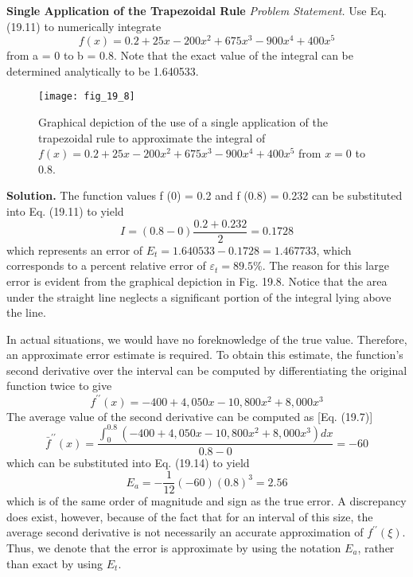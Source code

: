 \documentclass[../main.tex]{subfiles}
\begin{document}
\begin{exmp} \textbf{Single Application of the Trapezoidal Rule}
    \noindent\textit{Problem Statement.} Use Eq. (19.11) to numerically integrate
    \begin{equation}
		f(x)=0.2+25 x-200 x^{2}+675 x^{3}-900 x^{4}+400 x^{5}\nonumber
		\end{equation}
		from a = 0 to b = 0.8. Note that the exact value of the integral can be determined analytically to be 1.640533.

		\begin{figure}[H]
			\centering
			\texttt{[image: fig\_19\_8]}
		   \caption{\textsf{Graphical depiction of the use of a single application of the trapezoidal rule to approximate the integral of $f(x)=0.2+25 x-200 x^{2}+675 x^{3}-900 x^{4}+400 x^{5}$ from $x=0$ to $0.8$.}}\label{fig:fig_19_8}
		\end{figure}

	\noindent \textbf{Solution.} The function values f (0) = 0.2 and f (0.8) = 0.232 can be substituted into
	Eq. (19.11) to yield
	$$
I=(0.8-0) \frac{0.2+0.232}{2}=0.1728
$$
which represents an error of $E_{t}=1.640533-0.1728=1.467733$, which corresponds to a percent relative error of $\varepsilon_{t}=89.5 \%$. The reason for this large error is evident from the graphical depiction in Fig. 19.8. Notice that the area under the straight line neglects a significant portion of the integral lying above the line.

In actual situations, we would have no foreknowledge of the true value. Therefore, an approximate error estimate is required. To obtain this estimate, the function's second derivative over the interval can be computed by differentiating the original function twice to give
$$
f^{\prime \prime}(x)=-400+4,050 x-10,800 x^{2}+8,000 x^{3}
$$
The average value of the second derivative can be computed as [Eq. (19.7)]
$$
\bar{f}^{\prime \prime}(x)=\frac{\int_{0}^{0.8}\left(-400+4,050 x-10,800 x^{2}+8,000 x^{3}\right) d x}{0.8-0}=-60
$$
which can be substituted into Eq. (19.14) to yield
$$
E_{a}=-\frac{1}{12}(-60)(0.8)^{3}=2.56
$$
which is of the same order of magnitude and sign as the true error. A discrepancy does exist, however, because of the fact that for an interval of this size, the average second derivative is not necessarily an accurate approximation of $f^{\prime \prime}(\xi)$. Thus, we denote that the error is approximate by using the notation $E_{a}$, rather than exact by using $E_{t}$.
\end{exmp}
\end{document}
